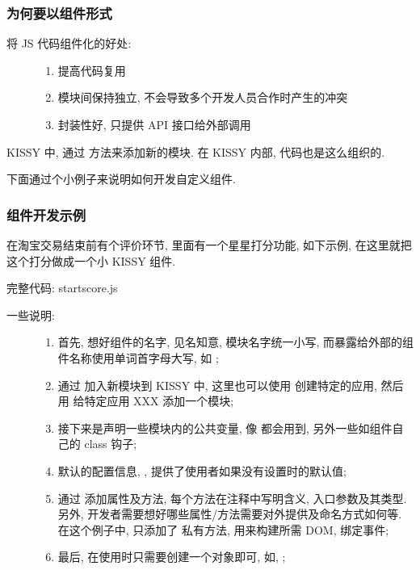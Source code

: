 \documentclass[letterpaper,10pt,english]{sphinxmanual}
\begin{document}
\subsubsection{为何要以组件形式}
\label{quickstart/yourwidgets:id2}\begin{description}
\item[{将 JS 代码组件化的好处:}] \leavevmode\begin{enumerate}
\item {}
提高代码复用

\item {}
模块间保持独立, 不会导致多个开发人员合作时产生的冲突

\item {}
封装性好, 只提供 API 接口给外部调用

\end{enumerate}

\end{description}

KISSY 中, 通过  方法来添加新的模块. 在 KISSY 内部, 代码也是这么组织的.

下面通过个小例子来说明如何开发自定义组件.


\subsubsection{组件开发示例}
\label{quickstart/yourwidgets:id3}
在淘宝交易结束前有个评价环节, 里面有一个星星打分功能, 如下示例, 在这里就把这个打分做成一个小 KISSY 组件.

完整代码: startscore.js
\begin{description}
\item[{一些说明:}] \leavevmode\begin{enumerate}
\item {}
首先, 想好组件的名字, 见名知意, 模块名字统一小写, 而暴露给外部的组件名称使用单词首字母大写, 如 ;

\item {}
通过  加入新模块到 KISSY 中, 这里也可以使用  创建特定的应用, 然后用  给特定应用 XXX 添加一个模块;

\item {}
接下来是声明一些模块内的公共变量, 像  都会用到, 另外一些如组件自己的 class 钩子;

\item {}
默认的配置信息, , 提供了使用者如果没有设置时的默认值;

\item {}
通过  添加属性及方法, 每个方法在注释中写明含义, 入口参数及其类型. 另外, 开发者需要想好哪些属性/方法需要对外提供及命名方式如何等. 在这个例子中, 只添加了  私有方法, 用来构建所需 DOM, 绑定事件;

\item {}
最后, 在使用时只需要创建一个对象即可, 如, ;

\end{enumerate}

\end{description}
\end{document}
